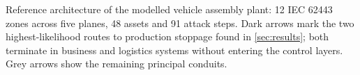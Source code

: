 \begin{capmwidefigure}
{\begin{tikzpicture}
\end{tikzpicture}}
\caption{Reference architecture of the modelled vehicle assembly plant: 12 IEC
62443 zones across five planes, 48 assets and 91 attack steps. Dark arrows mark
the two highest-likelihood routes to production stoppage found in
\cref{sec:results}; both terminate in business and logistics systems without
entering the control layers. Grey arrows show the remaining principal
conduits.}
\label{fig:architecture}
\end{capmwidefigure}
